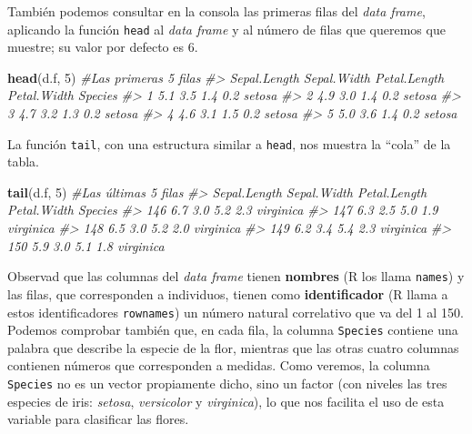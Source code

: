 \documentclass[
]{book}
\newenvironment{Shaded}{\begin{snugshade}}{\end{snugshade}}
\newcommand{\CommentTok}[1]{\textcolor[rgb]{0.56,0.35,0.01}{\textit{#1}}}
\newcommand{\DecValTok}[1]{\textcolor[rgb]{0.00,0.00,0.81}{#1}}
\newcommand{\KeywordTok}[1]{\textcolor[rgb]{0.13,0.29,0.53}{\textbf{#1}}}
\newcommand{\NormalTok}[1]{#1}
\theoremstyle{definition}
\theoremstyle{definition}
\theoremstyle{definition}
\theoremstyle{remark}
\begin{document}
También podemos consultar en la consola las primeras filas del \emph{data frame}, aplicando la función \texttt{head} al \emph{data frame} y al número de filas que queremos que muestre; su valor por defecto es 6.

\begin{Shaded}
\begin{Highlighting}[]
\KeywordTok{head}\NormalTok{(d.f, }\DecValTok{5}\NormalTok{)  }\CommentTok{\#Las primeras 5 filas}
\CommentTok{\#\textgreater{}   Sepal.Length Sepal.Width Petal.Length Petal.Width Species}
\CommentTok{\#\textgreater{} 1          5.1         3.5          1.4         0.2  setosa}
\CommentTok{\#\textgreater{} 2          4.9         3.0          1.4         0.2  setosa}
\CommentTok{\#\textgreater{} 3          4.7         3.2          1.3         0.2  setosa}
\CommentTok{\#\textgreater{} 4          4.6         3.1          1.5         0.2  setosa}
\CommentTok{\#\textgreater{} 5          5.0         3.6          1.4         0.2  setosa}
\end{Highlighting}
\end{Shaded}

La función \texttt{tail}, con una estructura similar a \texttt{head}, nos muestra la ``cola'' de la tabla.

\begin{Shaded}
\begin{Highlighting}[]
\KeywordTok{tail}\NormalTok{(d.f, }\DecValTok{5}\NormalTok{)    }\CommentTok{\#Las últimas 5 filas}
\CommentTok{\#\textgreater{}     Sepal.Length Sepal.Width Petal.Length Petal.Width   Species}
\CommentTok{\#\textgreater{} 146          6.7         3.0          5.2         2.3 virginica}
\CommentTok{\#\textgreater{} 147          6.3         2.5          5.0         1.9 virginica}
\CommentTok{\#\textgreater{} 148          6.5         3.0          5.2         2.0 virginica}
\CommentTok{\#\textgreater{} 149          6.2         3.4          5.4         2.3 virginica}
\CommentTok{\#\textgreater{} 150          5.9         3.0          5.1         1.8 virginica}
\end{Highlighting}
\end{Shaded}

Observad que las columnas del \emph{data frame} tienen \textbf{nombres} (R los llama \texttt{names}) y las filas, que corresponden a individuos, tienen como \textbf{identificador} (R llama a estos identificadores \texttt{rownames}) un número natural correlativo que va del 1 al 150. Podemos comprobar también que, en cada fila, la columna \texttt{Species} contiene una palabra que describe la especie de la flor, mientras que las otras cuatro columnas contienen números que corresponden a medidas.
Como veremos, la columna \texttt{Species} no es un vector propiamente dicho, sino un factor (con niveles las tres especies de iris: \emph{setosa}, \emph{versicolor} y \emph{virginica}), lo que nos facilita el uso de esta variable para clasificar las flores.
\end{document}
